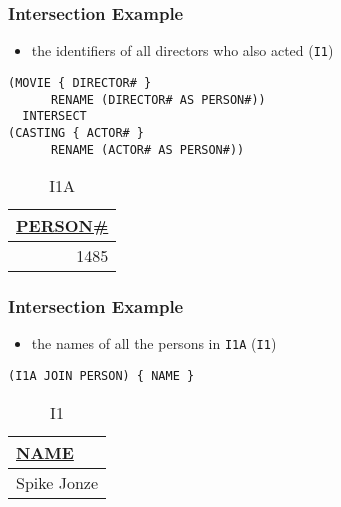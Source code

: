 \documentclass[dvipsnames]{beamer}
\theoremstyle{plain}
\begin{document}
\begin{frame}[fragile]
  \frametitle{Intersection Example}

  \begin{example}
    \begin{itemize}
      \item the identifiers of all directors who also acted (\texttt{I1})
    \end{itemize}

    \begin{lstlisting}
(MOVIE { DIRECTOR# }
      RENAME (DIRECTOR# AS PERSON#))
  INTERSECT
(CASTING { ACTOR# }
      RENAME (ACTOR# AS PERSON#))
    \end{lstlisting}

    \pause
    \vspace{-10pt}
    \begin{tiny}
    \begin{table}
      \caption{I1A}
      \begin{tabular}{|r|}\hline
\underline{PERSON\#}\\[2pt]\hline\hline
                1485\\\hline
      \end{tabular}
    \end{table}
    \end{tiny}
  \end{example}
\end{frame}

\begin{frame}[fragile]
  \frametitle{Intersection Example}

  \begin{example}
    \begin{itemize}
      \item the names of all the persons in \texttt{I1A} (\texttt{I1})
    \end{itemize}

    \begin{lstlisting}
(I1A JOIN PERSON) { NAME }
    \end{lstlisting}

    \pause
    \vspace{-10pt}
    \begin{tiny}
    \begin{table}
      \caption{I1}
      \begin{tabular}{|l|}\hline
\underline{NAME}\\[2pt]\hline\hline
Spike Jonze     \\\hline
      \end{tabular}
    \end{table}
    \end{tiny}
  \end{example}
\end{frame}
\end{document}
